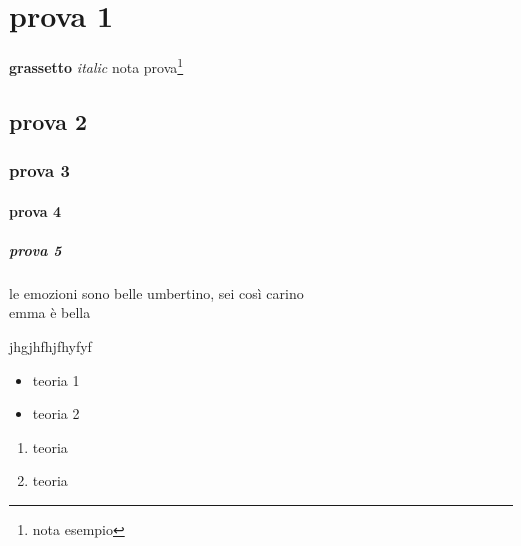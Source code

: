 \section{prova 1}
\textbf{grassetto}
\textit{italic}\cite{DeMasi_SmartWorkingRivoluzioneLavoroIntelligente}
nota prova\footnote{nota esempio}

\subsection{prova 2}
\subsubsection*{prova 3}
\paragraph{prova 4}
\subparagraph{prova 5}

le emozioni sono belle umbertino, sei così carino
\\emma è bella

jhgjhfhjfhyfyf
\begin{itemize}
    \item teoria 1 
    \item teoria 2 
\end{itemize}

\begin{enumerate}
    \item teoria
    \item teoria
\end{enumerate}